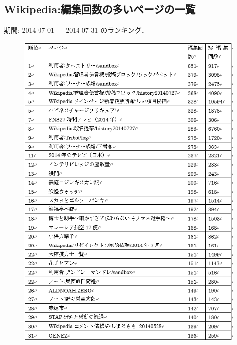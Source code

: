 \subsection{Wikipedia:編集回数の多いページの一覧}

期間: 2014-07-01 — 2014-07-31 のランキング．


\begin{figure}[H]
\centering
\includegraphics[width=12cm]{sample6.png}

\end{figure}


